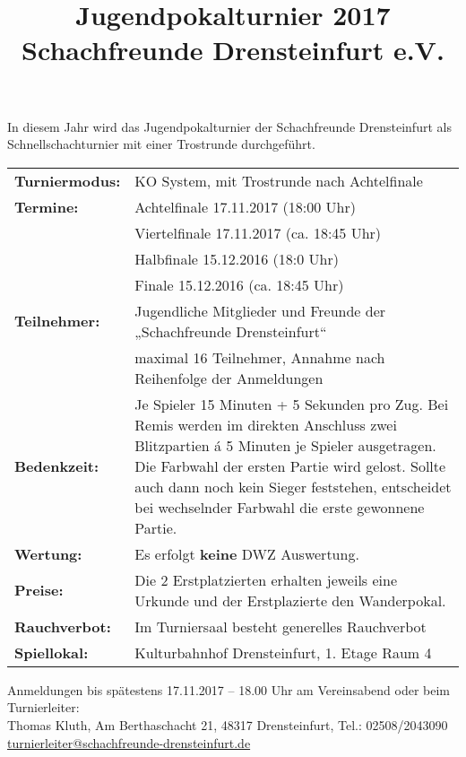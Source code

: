 \documentclass[a4paper,parskip=full-,DIV18]{scrartcl}
\title{Jugendpokalturnier 2017\\Schachfreunde Drensteinfurt e.V.}
\date{}
\begin{document}
\maketitle

In diesem Jahr wird das Jugendpokalturnier der Schachfreunde Drensteinfurt als Schnellschachturnier mit einer Trostrunde durchgeführt.

\bigskip

\begin{tabular}{p{3 cm} p{13.5 cm}}
	\textbf{Turniermodus:} & KO System, mit Trostrunde nach Achtelfinale          \\
	\textbf{Termine:}      & Achtelfinale 17.11.2017 (18:00 Uhr)                  \\
	                       & Viertelfinale 17.11.2017 (ca. 18:45 Uhr)             \\
	                       & Halbfinale 15.12.2016 (18:0 Uhr)                    \\
	                       & Finale 15.12.2016 (ca. 18:45 Uhr)                    \\
	\textbf{Teilnehmer:}   & Jugendliche Mitglieder und Freunde der „Schachfreunde Drensteinfurt“ \\
	\textbf{}             & maximal 16 Teilnehmer, Annahme nach Reihenfolge der Anmeldungen \\
	\textbf{Bedenkzeit:}             & Je Spieler 15 Minuten + 5 Sekunden pro Zug. Bei Remis werden im direkten Anschluss zwei Blitzpartien á 5 Minuten je Spieler ausgetragen. Die Farbwahl der ersten Partie wird gelost. Sollte auch dann noch kein Sieger feststehen, entscheidet bei wechselnder Farbwahl die erste gewonnene Partie. \\
	\textbf{Wertung:}             & Es erfolgt \textbf{keine} DWZ Auswertung. \\
	\textbf{Preise:}             & Die 2 Erstplatzierten erhalten jeweils eine Urkunde und der Erstplazierte den Wanderpokal. \\
	\textbf{Rauchverbot:}             & Im Turniersaal besteht generelles Rauchverbot \\
	\textbf{Spiellokal:}             & Kulturbahnhof Drensteinfurt, 1. Etage Raum 4
\end{tabular}


\bigskip

Anmeldungen bis spätestens 17.11.2017 – 18.00 Uhr am Vereinsabend oder beim Turnierleiter:\\
Thomas Kluth, Am Berthaschacht 21, 48317 Drensteinfurt, Tel.: 02508/2043090\\
\href{mailto:turnierleiter@schachfreunde-drensteinfurt.de}{turnierleiter@schachfreunde-drensteinfurt.de}
\end{document}
